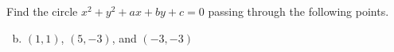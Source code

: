\documentclass[../main.tex]{subfiles}
\begin{document}
Find the circle $x^2 + y^2 + ax + by + c = 0$ passing through the following points.

\begin{enumerate}[a)]
	\setcounter{enumi}{1}
	\item $(1, 1)$, $(5, -3)$, and $(-3, -3)$
\end{enumerate}
\end{document}

